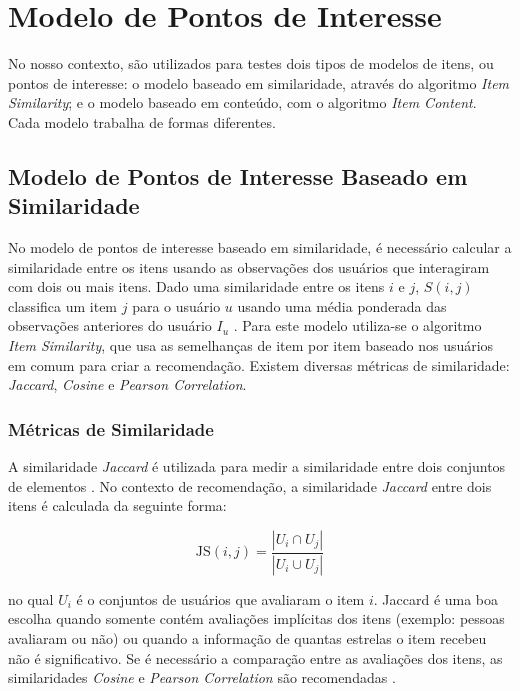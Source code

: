 \section{Modelo de Pontos de Interesse}

No nosso contexto, são utilizados para testes dois tipos de modelos de itens, ou pontos de interesse: o modelo baseado em similaridade, através do algoritmo \textit{Item Similarity}; e o modelo baseado em conteúdo, com o algoritmo \textit{Item Content}. Cada modelo trabalha de formas diferentes.

\subsection{Modelo de Pontos de Interesse Baseado em Similaridade}

No modelo de pontos de interesse baseado em similaridade, é necessário calcular a similaridade entre os itens usando as observações dos usuários que interagiram com dois ou mais itens. Dado uma similaridade entre os itens $i$ e $j$, $S(i,j)$ classifica um item $j$ para o usuário $u$ usando uma média ponderada das observações anteriores do usuário $I_u$ \citep{Ricci:2010:RSH:1941884}. Para este modelo utiliza-se o algoritmo \textit{Item Similarity}, que usa as semelhanças de item por item baseado nos usuários em comum para criar a recomendação. Existem diversas métricas de similaridade: \textit{Jaccard}, \textit{Cosine} e \textit{Pearson Correlation}.

\subsubsection{Métricas de Similaridade}
\label{subsubsec:similarity_metrics}

A similaridade \textit{Jaccard} é utilizada para medir a similaridade entre dois conjuntos de elementos \citep{Ricci:2010:RSH:1941884}. No contexto de recomendação, a similaridade \textit{Jaccard} entre dois itens é calculada da seguinte forma:

\begin{equation}
    \mbox{JS}(i,j) = \frac{|U_i \cap U_j|}{|U_i \cup U_j|}
\end{equation}

no qual $U_i$ é o conjuntos de usuários que avaliaram o item $i$. Jaccard é uma boa escolha quando somente contém avaliações implícitas dos itens (exemplo: pessoas avaliaram ou não) ou quando a informação de quantas estrelas o item recebeu não é significativo. Se é necessário a comparação entre as avaliações dos itens, as similaridades \textit{Cosine} e \textit{Pearson Correlation} são recomendadas \citep{Ricci:2010:RSH:1941884}.

